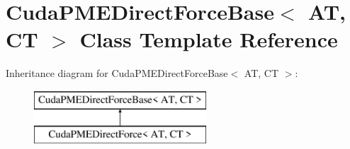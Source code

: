 \hypertarget{classCudaPMEDirectForceBase}{}\section{Cuda\+P\+M\+E\+Direct\+Force\+Base$<$ AT, CT $>$ Class Template Reference}
\label{classCudaPMEDirectForceBase}
Inheritance diagram for Cuda\+P\+M\+E\+Direct\+Force\+Base$<$ AT, CT $>$\+:\begin{figure}[H]
\begin{center}
\leavevmode
\includegraphics[height=2.000000cm]{classCudaPMEDirectForceBase}
\end{center}
\end{figure}

